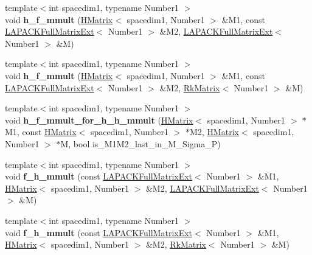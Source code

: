 \begin{DoxyCompactItemize}
{\footnotesize template$<$int spacedim1, typename Number1 $>$ }\\void {\bfseries h\+\_\+f\+\_\+mmult} (\hyperlink{classHMatrix}{H\+Matrix}$<$ spacedim1, Number1 $>$ \&M1, const \hyperlink{classLAPACKFullMatrixExt}{L\+A\+P\+A\+C\+K\+Full\+Matrix\+Ext}$<$ Number1 $>$ \&M2, \hyperlink{classLAPACKFullMatrixExt}{L\+A\+P\+A\+C\+K\+Full\+Matrix\+Ext}$<$ Number1 $>$ \&M)
\item 
\mbox{\label{classRkMatrix_aea3866052a5345742ad9f44f11f33989}} 
{\footnotesize template$<$int spacedim1, typename Number1 $>$ }\\void {\bfseries h\+\_\+f\+\_\+mmult} (\hyperlink{classHMatrix}{H\+Matrix}$<$ spacedim1, Number1 $>$ \&M1, const \hyperlink{classLAPACKFullMatrixExt}{L\+A\+P\+A\+C\+K\+Full\+Matrix\+Ext}$<$ Number1 $>$ \&M2, \hyperlink{classRkMatrix}{Rk\+Matrix}$<$ Number1 $>$ \&M)
\item 
\mbox{\label{classRkMatrix_a897365f6716975f71b528f610498c69b}} 
{\footnotesize template$<$int spacedim1, typename Number1 $>$ }\\void {\bfseries h\+\_\+f\+\_\+mmult\+\_\+for\+\_\+h\+\_\+h\+\_\+mmult} (\hyperlink{classHMatrix}{H\+Matrix}$<$ spacedim1, Number1 $>$ $\ast$M1, const \hyperlink{classHMatrix}{H\+Matrix}$<$ spacedim1, Number1 $>$ $\ast$M2, \hyperlink{classHMatrix}{H\+Matrix}$<$ spacedim1, Number1 $>$ $\ast$M, bool is\+\_\+\+M1\+M2\+\_\+last\+\_\+in\+\_\+\+M\+\_\+\+Sigma\+\_\+P)
\item 
\mbox{\label{classRkMatrix_a67b0f45b3a6734fef74d90f28fcefbc1}} 
{\footnotesize template$<$int spacedim1, typename Number1 $>$ }\\void {\bfseries f\+\_\+h\+\_\+mmult} (const \hyperlink{classLAPACKFullMatrixExt}{L\+A\+P\+A\+C\+K\+Full\+Matrix\+Ext}$<$ Number1 $>$ \&M1, \hyperlink{classHMatrix}{H\+Matrix}$<$ spacedim1, Number1 $>$ \&M2, \hyperlink{classLAPACKFullMatrixExt}{L\+A\+P\+A\+C\+K\+Full\+Matrix\+Ext}$<$ Number1 $>$ \&M)
\item 
\mbox{\label{classRkMatrix_a66d1ce72cb294b2c4da6536250905a32}} 
{\footnotesize template$<$int spacedim1, typename Number1 $>$ }\\void {\bfseries f\+\_\+h\+\_\+mmult} (const \hyperlink{classLAPACKFullMatrixExt}{L\+A\+P\+A\+C\+K\+Full\+Matrix\+Ext}$<$ Number1 $>$ \&M1, \hyperlink{classHMatrix}{H\+Matrix}$<$ spacedim1, Number1 $>$ \&M2, \hyperlink{classRkMatrix}{Rk\+Matrix}$<$ Number1 $>$ \&M)

\end{DoxyCompactItemize}
